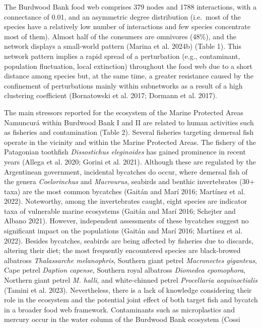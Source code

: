 \documentclass[
]{article}
\begin{document}
The Burdwood Bank food web comprises 379 nodes and 1788 interactions,
with a connectance of 0.01, and an asymmetric degree distribution
(i.e.~most of the species have a relatively low number of interactions
and few species concentrate most of them). Almost half of the consumers
are omnivores (48\%), and the network displays a small-world pattern
(Marina et al. 2024b) (Table 1). This network pattern implies a rapid
spread of a perturbation (e.g., contaminant, population fluctuation,
local extinction) throughout the food web due to a short distance among
species but, at the same time, a greater resistance caused by the
confinement of perturbations mainly within subnetworks as a result of a
high clustering coefficient (Bornatowski et al. 2017; Dormann et al.
2017).

The main stressors reported for the ecosystem of the Marine Protected
Areas Namuncurá within Burdwood Bank I and II are related to human
activities such as fisheries and contamination (Table 2). Several
fisheries targeting demersal fish operate in the vicinity and within the
Marine Protected Areas. The fishery of the Patagonian toothfish
\emph{Dissostichus eleginoides} has gained prominence in recent years
(Allega et al. 2020; Gorini et al. 2021). Although these are regulated
by the Argentinean government, incidental bycatches do occur, where
demersal fish of the genera \emph{Coelorinchus} and \emph{Macrourus},
seabirds and benthic invertebrates (30+ taxa) are the most common
bycatches (Gaitán and Marí 2016; Martínez et al. 2022). Noteworthy,
among the invertebrates caught, eight species are indicator taxa of
vulnerable marine ecosystems (Gaitán and Marí 2016; Schejter and Albano
2021). However, independent assessments of these bycatches suggest no
significant impact on the populations (Gaitán and Marí 2016; Martínez et
al. 2022). Besides bycatches, seabirds are being affected by fisheries
due to discards, altering their diet; the most frequently encountered
species are black-browed albatross \emph{Thalassarche melanophris},
Southern giant petrel \emph{Macronectes giganteus}, Cape petrel
\emph{Daption capense}, Southern royal albatross \emph{Diomedea
epomophora}, Northern giant petrel \emph{M. halli}, and white-chinned
petrel \emph{Procellaria aequinoctialis} (Tamini et al. 2023).
Nevertheless, there is a lack of knowledge considering their role in the
ecosystem and the potential joint effect of both target fish and bycatch
in a broader food web framework. Contaminants such as microplastics and
mercury occur in the water column of the Burdwood Bank ecosystem (Cossi
\end{document}
